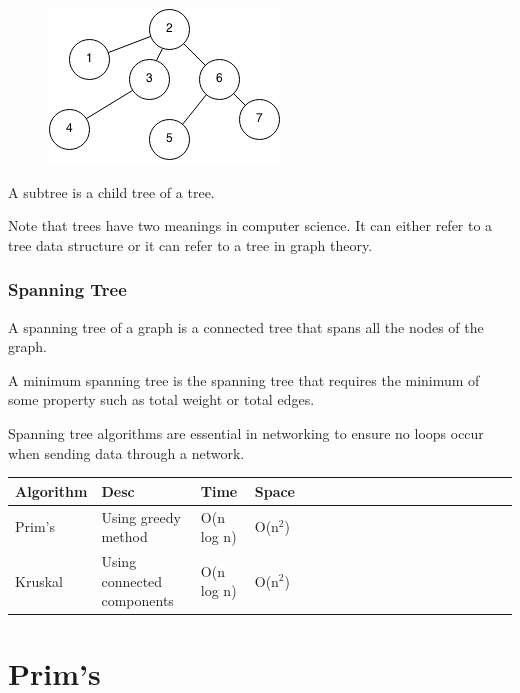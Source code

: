 \documentclass[11pt,oneside]{book}
\makeatletter
\def\maxwidth#1{\ifdim\Gin@nat@width>#1 #1\else\Gin@nat@width\fi}
\makeatother
\begin{document}
\vspace{5px}\begin{figure}[H]\centering
        \includegraphics[width=0.66\maxwidth{\textwidth}]{treegraph.png}
        \end{figure}

A subtree is a child tree of a tree.

Note that trees have two meanings in computer science. It can either refer to a tree data structure or it can refer to a tree in graph theory.


\subsubsection{Spanning Tree}



A spanning tree of a graph is a connected tree that spans all the nodes of the graph.

A minimum spanning tree is the spanning tree that requires the minimum of some property such as total weight or total edges.

Spanning tree algorithms are essential in networking to ensure no loops occur when sending data through a network.

\vspace{10px}\begin{tabulary}{0.4\linewidth}{|l|l|l|l|l|l|l|l|l|l|l|l|l|l|l|l|l|l|l}\hline


  Algorithm &
  Desc &
  Time &
  Space\\
\hline


  Prim's &
  Using greedy method &
  O(n log n) &
  O(n$^{2}$)\\

  Kruskal &
  Using connected components &
  O(n log n) &
  O(n$^{2}$)\\

\hline\end{tabulary}



        \section{ Prim's }
        
\end{document}
